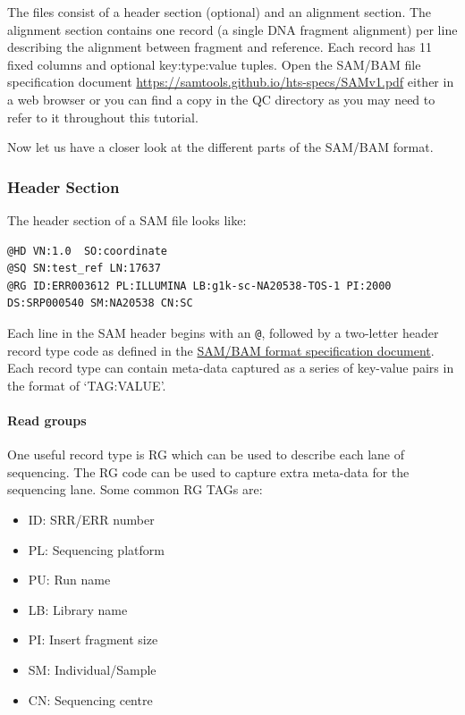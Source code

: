 \documentclass[11pt]{article}
\providecommand{\tightlist}{%
      \setlength{\itemsep}{0pt}\setlength{\parskip}{0pt}}
\begin{document}
The files consist of a header section (optional) and an alignment
section. The alignment section contains one record (a single DNA
fragment alignment) per line describing the alignment between fragment
and reference. Each record has 11 fixed columns and optional
key:type:value tuples. Open the SAM/BAM file specification document
\url{https://samtools.github.io/hts-specs/SAMv1.pdf} either in a web
browser or you can find a copy in the QC directory as you may need to
refer to it throughout this tutorial.

Now let us have a closer look at the different parts of the SAM/BAM
format.

\hypertarget{header-section}{%
\subsubsection{Header Section}\label{header-section}}

The header section of a SAM file looks like:

\begin{verbatim}
@HD VN:1.0  SO:coordinate
@SQ SN:test_ref LN:17637
@RG ID:ERR003612 PL:ILLUMINA LB:g1k-sc-NA20538-TOS-1 PI:2000 DS:SRP000540 SM:NA20538 CN:SC
\end{verbatim}

Each line in the SAM header begins with an \texttt{@}, followed by a
two-letter header record type code as defined in the
\href{https://samtools.github.io/hts-specs/SAMv1.pdf}{SAM/BAM format
specification document}. Each record type can contain meta-data captured
as a series of key-value pairs in the format of `TAG:VALUE'.

\hypertarget{read-groups}{%
\paragraph{Read groups}\label{read-groups}}

One useful record type is RG which can be used to describe each lane of
sequencing. The RG code can be used to capture extra meta-data for the
sequencing lane. Some common RG TAGs are:

\begin{itemize}
\tightlist
\item
  ID: SRR/ERR number
\item
  PL: Sequencing platform
\item
  PU: Run name
\item
  LB: Library name
\item
  PI: Insert fragment size
\item
  SM: Individual/Sample
\item
  CN: Sequencing centre
\end{itemize}
\end{document}
